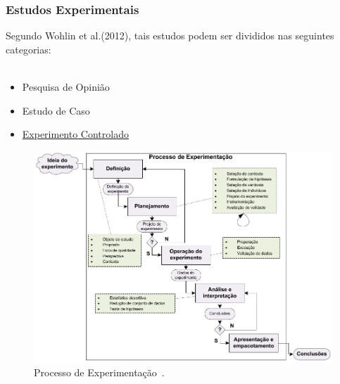 \documentclass[aspectratio=169]{beamer}
\begin{document}
\begin{frame}
\frametitle{Estudos Experimentais}
\justifying

Segundo Wohlin et al.(2012), tais estudos podem ser divididos nas seguintes categorias: \\~\\
\begin{itemize}
\item Pesquisa de Opinião
\item Estudo de Caso
\item \underline{Experimento Controlado}
\end{itemize}

\end{frame}

\begin{frame}

\begin{figure}
\centering
\includegraphics[scale=0.5]{images/experimentacao.pdf}
\caption{Processo de Experimentação~\cite{wohlin}.}
\label{image:processo}
\end{figure}

\end{frame}
\end{document}
